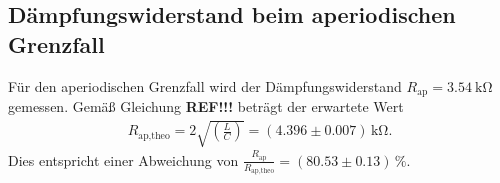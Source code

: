 \subsection{Dämpfungswiderstand beim aperiodischen Grenzfall}
Für den aperiodischen Grenzfall wird der Dämpfungswiderstand $R_\text{ap} = \qty{3.54}{\kilo\ohm}$ gemessen.
Gemäß Gleichung \textbf{REF!!!} beträgt der erwartete Wert 
\begin{align}
    R_\text{ap,theo} = 2 \sqrt{\left(\frac{L}{C}\right)} =  (\num{4.396} \pm \num{0.007}) \, \unit{\kilo\ohm}.
\end{align}
Dies entspricht einer Abweichung von $ \frac{R_\text{ap}}{R_\text{ap,theo}} = (\num{80.53} \pm \num{0.13}) \, \%$.
